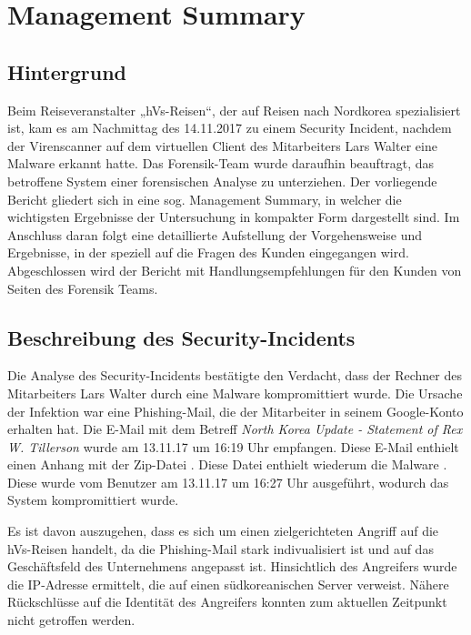 \chapter{Management Summary}

\section{Hintergrund}
Beim  Reiseveranstalter „hVs-Reisen“, der auf Reisen nach Nordkorea spezialisiert ist, kam es am Nachmittag des 14.11.2017 zu einem Security Incident, nachdem der
Virenscanner auf dem virtuellen Client des Mitarbeiters Lars Walter eine Malware
erkannt hatte.
Das Forensik-Team wurde daraufhin beauftragt, das betroffene System einer forensischen Analyse zu unterziehen. Der vorliegende Bericht gliedert sich in eine sog. Management Summary, in welcher die wichtigsten Ergebnisse der Untersuchung in kompakter Form dargestellt sind. Im Anschluss daran folgt eine detaillierte Aufstellung der Vorgehensweise und Ergebnisse, in der speziell auf die Fragen des Kunden eingegangen wird. Abgeschlossen wird der Bericht mit Handlungsempfehlungen für den Kunden von Seiten des Forensik Teams.

\section{Beschreibung des Security-Incidents}
Die Analyse des Security-Incidents bestätigte den Verdacht, dass der Rechner des Mitarbeiters Lars Walter durch eine Malware kompromittiert wurde.
Die Ursache der Infektion war eine Phishing-Mail, die der Mitarbeiter in seinem Google-Konto  erhalten hat.
Die E-Mail mit dem Betreff \textit{North Korea Update - Statement of Rex W. Tillerson} wurde am 13.11.17 um 16:19 Uhr empfangen.
Diese E-Mail enthielt einen Anhang mit der Zip-Datei
.
Diese Datei enthielt wiederum die Malware
.
Diese wurde vom Benutzer am 13.11.17 um 16:27 Uhr ausgeführt, wodurch das System kompromittiert wurde.

Es ist davon auszugehen, dass es sich um einen zielgerichteten Angriff auf die hVs-Reisen handelt, da die Phishing-Mail stark indivualisiert ist und auf das Geschäftsfeld des Unternehmens angepasst ist.
Hinsichtlich des Angreifers wurde die IP-Adresse  ermittelt, die auf einen südkoreanischen Server verweist.
Nähere Rückschlüsse auf die Identität des Angreifers konnten zum aktuellen Zeitpunkt nicht getroffen werden.

